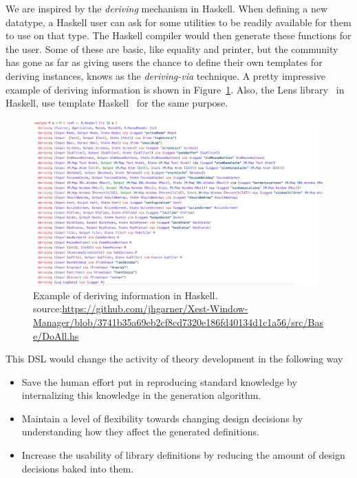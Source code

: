 We are inspired by the \emph{deriving} mechanism in Haskell. When defining a new datatype, a Haskell user can ask for some utilities to be readily available for them to use on that type. The Haskell compiler would then generate these functions for the user. Some of these are basic, like equality and printer, but the community has gone as far as giving users the chance to define their own templates for deriving instances, knows as the \emph{deriving-via} technique. A pretty impressive example of deriving information is shown in Figure~\ref{fig:deriving-via-example}. 
Also, the Lens library~\cite{lensesLib} in Haskell, use template Haskell~\cite{sheard2002TH} for the same purpose. 
\begin{figure}
 \includegraphics[scale=0.5,width=\linewidth]{figures/deriving-via-example.png}
 \caption{Example of deriving information in Haskell. source:\url{https://github.com/jhgarner/Xest-Window-Manager/blob/3741b35a69eb2cf8cd7320e186fd40134d1c1a56/src/Base/DoAll.hs}}
 \label{fig:deriving-via-example}
\end{figure}


This DSL would change the activity of theory development in the following way 
\begin{itemize}
    \item Save the human effort put in reproducing standard knowledge by internalizing this knowledge in the generation algorithm.
    \item Maintain a level of flexibility towards changing design decisions by understanding how they affect the generated definitions.
    \item Increase the usability of library definitions by reducing the amount of design decisions baked into them. 
\end{itemize}  

